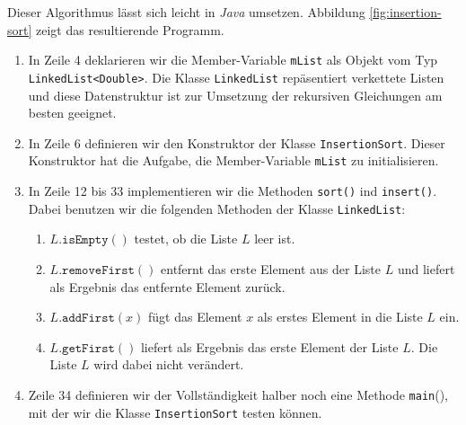 Dieser Algorithmus l\"asst sich leicht in \textsl{Java} umsetzen. Abbildung
\ref{fig:insertion-sort} zeigt das resultierende Programm.
\begin{enumerate}
\item In Zeile 4 deklarieren wir die Member-Variable \texttt{mList}
      als Objekt vom Typ \texttt{LinkedList<Double>}.
      Die Klasse \texttt{LinkedList} rep\"asentiert 
      verkettete Listen und diese Datenstruktur ist zur Umsetzung der rekursiven
      Gleichungen am besten geeignet.
\item In Zeile 6 definieren wir den Konstruktor der Klasse \texttt{InsertionSort}.
      Dieser Konstruktor hat die Aufgabe, die Member-Variable \texttt{mList} zu
      initialisieren.  
\item In Zeile 12 bis 33 implementieren wir die Methoden \texttt{sort()} ind
      \texttt{insert()}.  Dabei benutzen wir die folgenden Methoden der Klasse
      \texttt{LinkedList}:
      \begin{enumerate}
      \item $L\texttt{.isEmpty}()$ testet, ob die Liste $L$ leer ist.
      \item $L\texttt{.removeFirst}()$ entfernt das erste Element aus der Liste $L$
            und liefert als Ergebnis das entfernte Element zur\"uck.
      \item $L\texttt{.addFirst}(x)$ f\"ugt das Element $x$ als erstes Element in die Liste
            $L$ ein.
      \item $L\texttt{.getFirst}()$ liefert als Ergebnis das erste Element der Liste $L$.
            Die Liste $L$ wird dabei nicht ver\"andert.
      \end{enumerate}
\item Zeile 34 definieren wir der Vollst\"andigkeit halber noch eine Methode \texttt{main}(),
      mit der wir die Klasse \texttt{InsertionSort} testen k\"onnen.
\end{enumerate}

